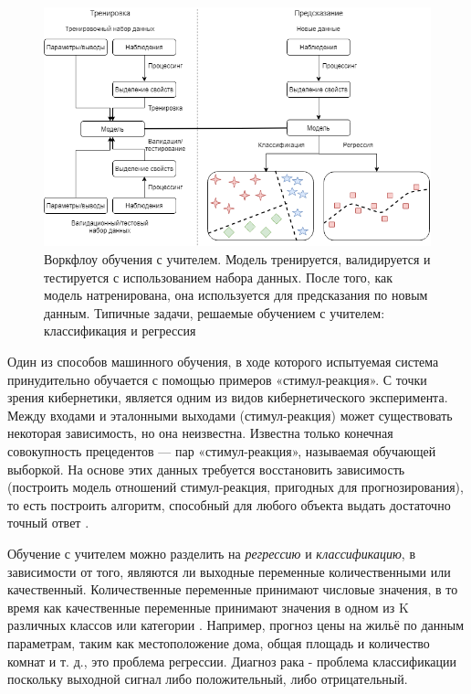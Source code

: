 \begin{figure}[ht!]
	\center
	\includegraphics [scale=0.60] {my_folder/images/ch1/supervised-learning.png}
	\caption{Воркфлоу обучения с учителем. Модель тренируется, валидируется и тестируется с использованием набора данных. После того, как модель натренирована, она используется для предсказания по новым данным. Типичные задачи, решаемые обучением с учителем: классификация и регрессия}
	\label{fig:supervised-learning}
\end{figure}

Один из способов машинного обучения, в ходе которого испытуемая система принудительно обучается с помощью примеров «стимул-реакция». С точки зрения кибернетики, является одним из видов кибернетического эксперимента. Между входами и эталонными выходами (стимул-реакция) может существовать некоторая зависимость, но она неизвестна. Известна только конечная совокупность прецедентов — пар «стимул-реакция», называемая обучающей выборкой. На основе этих данных требуется восстановить зависимость (построить модель отношений стимул-реакция, пригодных для прогнозирования), то есть построить алгоритм, способный для любого объекта выдать достаточно точный ответ \cite{james2014introduction}.

Обучение с учителем можно разделить на \textit{регрессию} и \textit{классификацию}, в зависимости от того, являются ли выходные переменные количественными или качественный. Количественные переменные принимают числовые значения, в то время как качественные переменные принимают значения в одном из K различных классов или категории \cite{james2014introduction}. Например, прогноз цены на жильё по данным параметрам, таким как местоположение дома, общая площадь и количество комнат и т. д., это проблема регрессии. Диагноз рака - проблема классификации поскольку выходной сигнал либо положительный, либо отрицательный.

